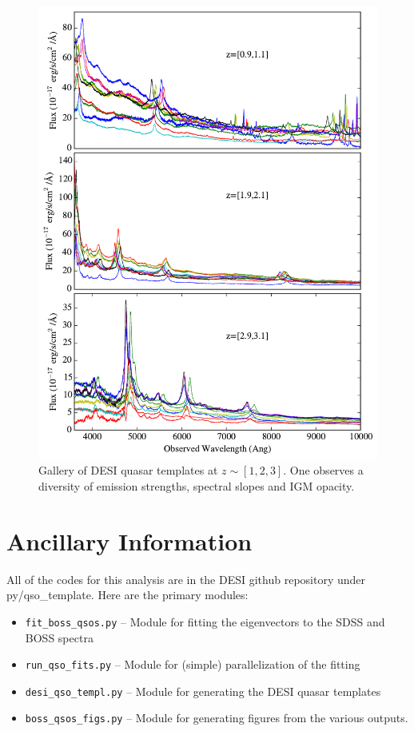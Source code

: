 \documentclass[11pt]{article}
\begin{document}
\begin{figure}[h!]
  \vskip -0.1in
\begin{center}
  \includegraphics[width=5in]{figures/fig_desi_template_gallery.pdf}
\end{center}
 \vskip -0.20in
  \caption{\footnotesize Gallery of DESI quasar templates at $z \sim
    [1,2,3]$.  One observes a diversity of emission strengths,
    spectral slopes and IGM opacity.
}\label{fig:gallery}
\vskip -0.1in
\end{figure}


\section{Ancillary Information}

All of the codes for this analysis are in the DESI github repository
under py/qso\_template.  Here are the primary modules:

\begin{itemize}
\item {\tt fit\_boss\_qsos.py} -- Module for fitting the eigenvectors
  to the SDSS and BOSS spectra
\item {\tt run\_qso\_fits.py} -- Module for (simple) parallelization
  of the fitting
\item {\tt desi\_qso\_templ.py} -- Module for generating the DESI
  quasar templates
\item {\tt boss\_qsos\_figs.py} -- Module for generating figures from
  the various outputs.
\end{itemize}
\end{document}
